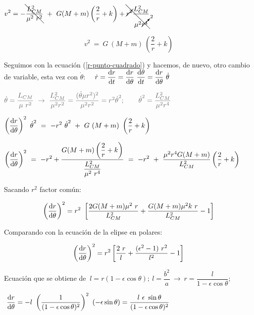 $\displaystyle v^2=- \bcancel{\dfrac{L^2_{CM}}{\mu^2\ r^2}} \ + \ G(M+m)\left( \dfrac 2 r  + k \right)+ \bcancel{ \cancel{r^2} \dfrac{L^2_{CM}}{\mu^2 \cancelto{2}{r^4}} }$

\begin{equation}
\label{v-cuadrado}
v^2 \ = \ G\ (M+m) \ \left( \dfrac 2 r + k \right)	
\end{equation}

Seguimos con la ecuación (\ref{r-punto-cuadrado}) y hacemos, de nuevo, otro cambio de variable, esta vez con $\dot{\theta}$:
$\quad \displaystyle \dot{r}=\dv{r}{t}=\dv{r}{\theta} \ \dv{\theta}{t}=\dv{r}{\theta}\  \dot{\theta}$

$\textcolor{gris}{\dot{\theta}=\dfrac{L_{CM}}{\mu\ r^2} \ \to \ \dfrac{L^2_{CM}}{\mu^2r^2}=\dfrac{(\dot{\theta} \mu r^2)^2}{\mu^2 r^2}=r^2 {\dot{\theta}}^2  ; \quad \quad {\dot{\theta}}^2= \dfrac{L^2_{CM}}{\mu^2r^4} }$



$\displaystyle \left( \dv{r}{\theta} \right)^2 \ {\dot{\theta}}^2 \ = \ -r^2 \  {\dot{\theta}}^2 \ + \ G\ (M+m)\ \left( \dfrac 2 r + k \right) $

$\displaystyle \left( \dv{r}{\theta} \right)^2 \ = \ 
-r^2 + \dfrac{ G (M+m) \left( \dfrac 2 r + k \right) }{ \dfrac{L^2_{CM}}{\mu^2\ r^4} } \ = \ -r^2 \ + \  \dfrac{  \mu^2r^4G(M+m)}{L^2_{CM}} \left( \dfrac 2 r + k \right)$

Sacando $r^2$ factor común:

\begin{equation}
\label{r-theta-2}
\left( \dv{r}{\theta} \right)^2 = r^2 \ \left[ \dfrac{2G(M+m)\mu^2\ r}{L^2_{CM}}+ \dfrac{G(M+m) \mu^2 k \ r}{L^2_{CM}} - 1   \right]
\end{equation}

Comparando con la ecuación de la elipse en polares:

\begin{equation}
\label{elpise-polares}
	\left( \dv{r}{\theta} \right)^2 = r^2  \left[ \dfrac{2 \ r}{l}+\dfrac{(\epsilon^2-1) \ r^2}{l^2} - 1 \right]	
\end{equation}

Ecuación que se obtiene de $\ l=r(1-\epsilon \cos \theta); \ l=\dfrac {b^2}a \ \to \ r=\dfrac l {1-\epsilon \cos \theta};$ 

$\displaystyle \  \dv{r}{\theta} = -l \ \left( \dfrac {1}{(1-\epsilon \cos \theta)^2} \right)^2 \ (-\epsilon \sin \theta)=\dfrac{l \ \epsilon \ \sin \theta}{(1-\epsilon \cos \theta)^2} $

